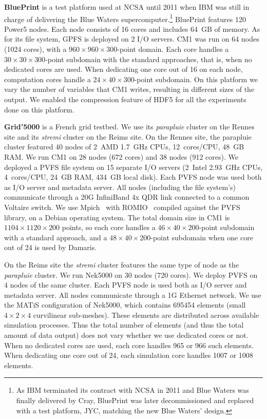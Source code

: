 \begin{description}
\item{\textbf{BluePrint}} is a test platform used at NCSA until 2011 when IBM was still in charge of
delivering the Blue Waters supercomputer.\footnote{As IBM terminated its contract with NCSA in 2011 
and Blue Waters was finally delivered by Cray, BluePrint was later decommissioned and replaced with a 
test platform, JYC, matching the new Blue Waters' design.}
BluePrint features 120 Power5 nodes. Each node consists of 16 cores and 
includes 64~GB of memory. As for its file system, GPFS is deployed on 2 I/O servers.
CM1 was run on 64 nodes (1024 cores), with a $960\times960\times300$-point
domain. Each core handles a $30\times30\times300$-point subdomain with the 
standard approaches, that is, when no dedicated cores are used. 
When dedicating one core out of 16 on each node, computation
cores handle a $24\times40\times300$-point subdomain. On this platform we 
vary the number of variables that CM1 writes, resulting in different sizes of the output.
We enabled the compression feature of HDF5 for all the experiments done on this platform.

\item{\textbf{Grid'5000}} is a French grid testbed. We use its \emph{parapluie} cluster
on the Rennes site and its \emph{stremi} cluster on the Reims site.
On the Rennes site, the parapluie cluster featured 40 nodes of 2~AMD 1.7~GHz CPUs, 12~cores/CPU, 48~GB RAM.
We run CM1 on 28 nodes (672 cores) and 38 nodes (912 cores).
We deployed a PVFS file system on 15 separate I/O servers (2~Intel 2.93~GHz CPUs,
4~cores/CPU, 24~GB RAM, 434~GB local disk). Each PVFS node was
used both as I/O server and metadata server. All nodes (including the file system's) communicate
through a 20G InfiniBand 4x QDR link connected to a common Voltaire switch. 
We use Mpich~\cite{mpich} with ROMIO~\cite{thakur1999data}
compiled against the PVFS library, on a Debian operating system.
The total domain size in CM1 is $1104\times1120\times200$ points, so each core 
handles a $46\times40\times200$-point subdomain with a standard approach, 
and a $48\times40\times200$-point subdomain when one core out of 24 is used by Damaris.

On the Reims site the \emph{stremi} cluster features the same type of node as the \emph{parapluie} cluster.
We run Nek5000 on 30 nodes (720 cores). We deploy PVFS on 4 nodes of the same cluster. Each
PVFS node is used both as I/O server and metadata server. All nodes communicate through a
1G Ethernet network.
We use the MATiS configuration of Nek5000, which contains 695454 elements (small $4 \times 2 \times 4$ curvilinear sub-meshes).
These elements are distributed across available simulation processes. Thus the total number
of elements (and thus the total amount of data output) does not vary whether we use dedicated cores or not.
When no dedicated cores are used, each core handles 965 or 966 such elements. When dedicating one
core out of 24, each simulation core handles 1007 or 1008 elements.


\end{description}
